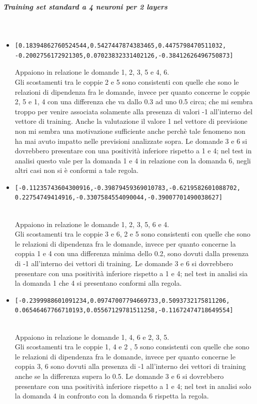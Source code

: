 \documentclass[10pt,a4paper]{article}
\begin{document}
\subparagraph{Training set standard a 4 neuroni per 2 layers}\mbox{}
\label{Training set standard su rete a 4 neuroni}
\\
\begin{itemize}
\item \begin{verbatim}[0.18394862760524544,0.5427447874383465,0.4475798470511032,
-0.2002756172921305,0.07023832331402126,-0.38412626496750873] \end{verbatim}
Appaiono in relazione le domande 1, 2, 3, 5 e 4, 6.\\
Gli scostamenti tra le coppie 2 e 5 sono consistenti con quelle che sono le relazioni  di dipendenza fra le domande, invece per quanto concerne le coppie 2, 5 e 1, 4 con una differenza che va dallo 0.3 ad uno 0.5 circa; che mi sembra troppo per venire associata solamente alla presenza di valori -1 all'interno del vettore di training. Anche la valutazione il valore 1 nel vettore di previsione non mi sembra una motivazione sufficiente anche perch\`e tale fenomeno non ha mai avuto impatto nelle previsioni analizzate sopra.
Le domande 3 e 6 si dovrebbero presentare con una positivit\`a inferiore rispetto a 1 e 4; nel test in analisi questo vale per la domanda 1 e 4 in relazione con la domanda 6, negli altri casi non si \`e conformi a tale regola.

\item \begin{verbatim}[-0.11235743604300916,-0.39879459369010783,-0.6219582601088702,
0.22754749414916,-0.3307584554090044,-0.39007701490038627] \end{verbatim}\\
Appaiono in relazione le domande 1, 2, 3, 5, 6 e 4.\\
Gli scostamenti tra le coppie 3 e 6, 2 e 5 sono consistenti con quelle che sono le relazioni di dipendenza fra le domande, invece per quanto concerne la coppia 1 e 4 con una differenza minima dello 0.2, sono dovuti dalla presenza di -1  all'interno dei vettori di training.
Le domande 3 e 6 si dovrebbero presentare con una positivit\`a inferiore rispetto a 1 e 4; nel test in analisi sia la domanda 1 che 4 si presentano conformi alla regola.

\item \begin{verbatim}[-0.2399988601091234,0.09747007794669733,0.5093732175811206,
0.06546467766710193,0.05567129781511258,-0.11672474718649554]\end{verbatim}\\
Appaiono in relazione le domande 1, 4, 6 e 2, 3, 5.\\
Gli scostamenti tra le  coppie 1, 4 e 2 , 5 sono consistenti con quelle che sono le relazioni di dipendenza fra le domande, invece per quanto concerne le coppia 3, 6 sono dovuti alla presenza di -1 all'interno dei vettori di training anche se la differenza supera lo 0.5.
Le domande 3 e 6 si dovrebbero presentare con una positivit\`a inferiore rispetto a 1 e 4; nel test in analisi solo la domanda 4 in confronto con la domanda 6 rispetta la regola.


\end{itemize}
\end{document}
